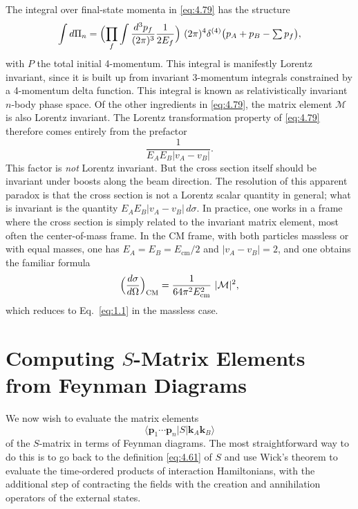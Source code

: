 The integral over final-state momenta in \eqref{eq:4.79} has the structure
\begin{equation}
  \int d\Pi_n = \Bigl( \prod_f \int \frac{d^3p_f}{(2\pi)^3}\frac{1}{2E_f}
    \Bigr)\ (2\pi)^4\delta^{(4)}\bigl( p_A+p_B-\textstyle\sum p_f \bigr),
  \label{eq:4.80}
\end{equation}
with $P$ the total initial 4-momentum.  This integral is manifestly Lorentz
invariant, since it is built up from invariant 3-momentum integrals
constrained by a 4-momentum delta function.  This integral is known as
relativistically invariant $n$-body phase space.  Of the other ingredients in
\eqref{eq:4.79}, the matrix element $\mathcal{M}$ is also Lorentz invariant.
The Lorentz transformation property of \eqref{eq:4.79} therefore comes
entirely from the prefactor
\begin{equation}
  \frac{1}{E_AE_B|v_A-v_B|} .
  \label{eq:4.81}
\end{equation}
This factor is \emph{not} Lorentz invariant.  But the cross section itself
should be invariant under boosts along the beam direction.  The resolution of
this apparent paradox is that the cross section is not a Lorentz scalar
quantity in general; what is invariant is the quantity $E_AE_B|v_A-v_B|\,
d\sigma$.  In practice, one works in a frame where the cross section is
simply related to the invariant matrix element, most often the
center-of-mass frame.  In the CM frame, with both particles massless or with
equal masses, one has $E_A = E_B = E_{\mathrm{cm}}/2$ and
$|v_A-v_B| = 2$, and one obtains the familiar formula
\begin{equation}
  \Bigl( \frac{d\sigma}{d\Omega} \Bigr)_{\mathrm{CM}}
    = \frac{1}{64\pi^2E_{\mathrm{cm}}^2}\ |\mathcal{M}|^2 ,
  \label{eq:4.82}
\end{equation}
which reduces to Eq.~\eqref{eq:1.1} in the massless case.

\section{Computing $S$-Matrix Elements from Feynman Diagrams}

We now wish to evaluate the matrix elements
\begin{equation}
  \langle \mathbf{p}_1\cdots\mathbf{p}_n|S|\mathbf{k}_A\mathbf{k}_B\rangle
  \label{eq:4.83}
\end{equation}
of the $S$-matrix in terms of Feynman diagrams.  The most straightforward
way to do this is to go back to the definition \eqref{eq:4.61} of $S$ and
use Wick's theorem to evaluate the time-ordered products of interaction
Hamiltonians, with the additional step of contracting the fields with the
creation and annihilation operators of the external states.

